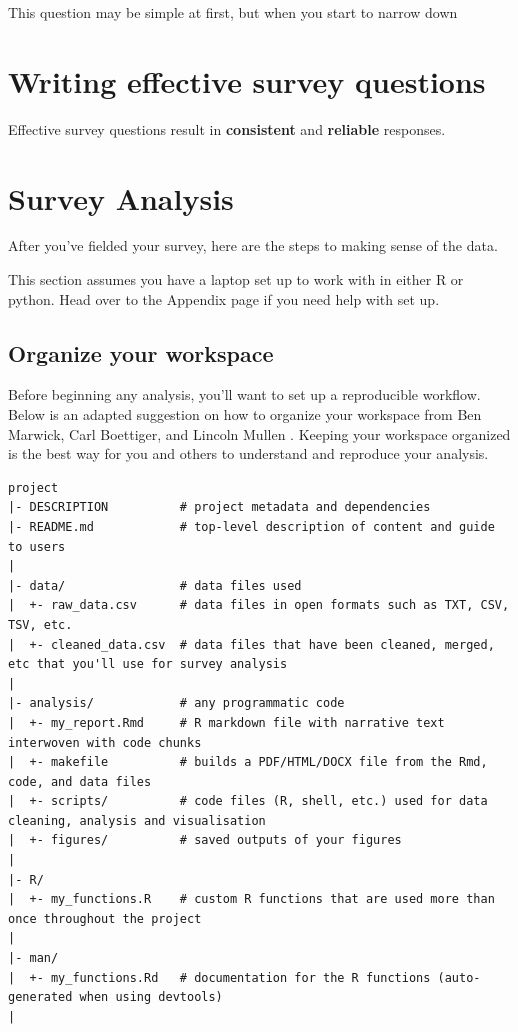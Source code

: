 \documentclass[]{book}
\begin{document}
This question may be simple at first, but when you start to narrow down

\chapter{Writing effective survey
questions}\label{writing-effective-survey-questions}

Effective survey questions result in \textbf{consistent} and
\textbf{reliable} responses.

\chapter{Survey Analysis}\label{analysis}

After you've fielded your survey, here are the steps to making sense of
the data.

This section assumes you have a laptop set up to work with in either R
or python. Head over to the Appendix page if you need help with set up.

\section{Organize your workspace}\label{organize-your-workspace}

Before beginning any analysis, you'll want to set up a reproducible
workflow. Below is an adapted suggestion on how to organize your
workspace from Ben Marwick, Carl Boettiger, and Lincoln Mullen
\citep{reproducible_workflow}. Keeping your workspace organized is the
best way for you and others to understand and reproduce your analysis.

\begin{verbatim}
project
|- DESCRIPTION          # project metadata and dependencies 
|- README.md            # top-level description of content and guide to users
|
|- data/                # data files used 
|  +- raw_data.csv      # data files in open formats such as TXT, CSV, TSV, etc.
|  +- cleaned_data.csv  # data files that have been cleaned, merged, etc that you'll use for survey analysis
|
|- analysis/            # any programmatic code
|  +- my_report.Rmd     # R markdown file with narrative text interwoven with code chunks 
|  +- makefile          # builds a PDF/HTML/DOCX file from the Rmd, code, and data files
|  +- scripts/          # code files (R, shell, etc.) used for data cleaning, analysis and visualisation
|  +- figures/          # saved outputs of your figures
|
|- R/                     
|  +- my_functions.R    # custom R functions that are used more than once throughout the project
|
|- man/
|  +- my_functions.Rd   # documentation for the R functions (auto-generated when using devtools)
|
\end{verbatim}
\end{document}
